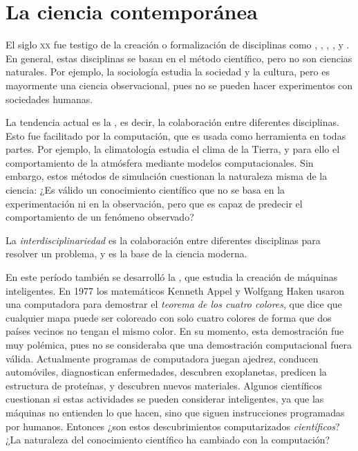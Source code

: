 \section{La ciencia contemporánea}
\label{sec:lacienciacontemporanea}

El siglo \textsc{xx} fue testigo de la creación o formalización de disciplinas como , , , , y .
En general, estas disciplinas se basan en el método científico, pero no son ciencias naturales.
Por ejemplo, la sociología estudia la sociedad y la cultura, pero es mayormente una ciencia observacional, pues no se pueden hacer experimentos con sociedades humanas.

La tendencia actual es la , es decir, la colaboración entre diferentes disciplinas.
Esto fue facilitado por la computación, que es usada como herramienta en todas partes.
Por ejemplo, la climatología estudia el clima de la Tierra, y para ello  el comportamiento de la atmósfera mediante modelos computacionales.
Sin embargo, estos métodos de simulación cuestionan la naturaleza misma de la ciencia: ¿Es válido un conocimiento científico que no se basa en la experimentación ni en la observación, pero que es capaz de predecir el comportamiento de un fenómeno observado?

\begin{remember}
	\label{rem:interdisciplinariedad}
	La \emph{interdisciplinariedad} es la colaboración entre diferentes disciplinas para resolver un problema, y es la base de la ciencia moderna.
\end{remember}

En este período también se desarrolló la , que estudia la creación de máquinas inteligentes.
En 1977 los matemáticos Kenneth Appel y Wolfgang Haken usaron una computadora para demostrar el \emph{teorema de los cuatro colores}, que dice que cualquier mapa puede ser coloreado con solo cuatro colores de forma que dos países vecinos no tengan el mismo color.
En su momento, esta demostración fue muy polémica, pues no se consideraba que una demostración computacional fuera válida.
Actualmente programas de computadora juegan ajedrez, conducen automóviles, diagnostican enfermedades, descubren exoplanetas, predicen la estructura de proteínas, y descubren nuevos materiales.
Algunos científicos cuestionan si estas actividades se pueden considerar inteligentes, ya que las máquinas no entienden lo que hacen, sino que siguen instrucciones programadas por humanos.
Entonces ¿son estos descubrimientos computarizados \emph{científicos}?
¿La naturaleza del conocimiento científico ha cambiado con la computación?

